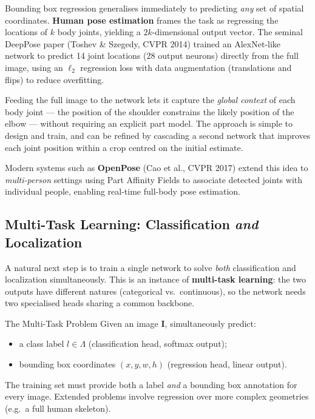 \documentclass[11pt,a4paper]{article}
\newcommand{\term}[1]{\textcolor{DefGreen}{\textbf{#1}}\index{#1}}
\begin{document}
Bounding box regression generalises immediately to predicting \emph{any} set of spatial coordinates. \term{Human pose estimation} frames the task as regressing the locations of $k$ body joints, yielding a $2k$-dimensional output vector. The seminal DeepPose paper (Toshev \& Szegedy, CVPR 2014) trained an AlexNet-like network to predict 14 joint locations (28 output neurons) directly from the full image, using an $\ell_2$ regression loss with data augmentation (translations and flips) to reduce overfitting.

\begin{insightbox}
Feeding the full image to the network lets it capture the \emph{global context} of each body joint — the position of the shoulder constrains the likely position of the elbow — without requiring an explicit part model. The approach is simple to design and train, and can be refined by cascading a second network that improves each joint position within a crop centred on the initial estimate.
\end{insightbox}

Modern systems such as \textbf{OpenPose} (Cao et al., CVPR 2017) extend this idea to \emph{multi-person} settings using Part Affinity Fields to associate detected joints with individual people, enabling real-time full-body pose estimation.

\subsection{Multi-Task Learning: Classification \emph{and} Localization}
\label{sec:multitask}

A natural next step is to train a single network to solve \emph{both} classification and localization simultaneously. This is an instance of \term{multi-task learning}: the two outputs have different natures (categorical vs.\ continuous), so the network needs two specialised heads sharing a common backbone.

\begin{defbox}{The Multi-Task Problem}
Given an image $\mathbf{I}$, simultaneously predict:
\begin{itemize}
  \item a class label $l \in \Lambda$ (classification head, softmax output);
  \item bounding box coordinates $(x, y, w, h)$ (regression head, linear output).
\end{itemize}
The training set must provide both a label \emph{and} a bounding box annotation for every image. Extended problems involve regression over more complex geometries (e.g.\ a full human skeleton).
\end{defbox}
\end{document}
